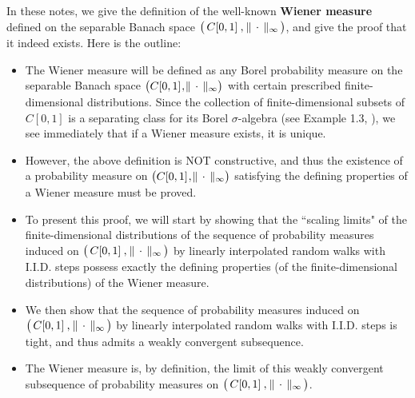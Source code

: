\documentclass[10pt, letterpaper]{article}
\newcommand{\Czo}{C[0,1]}
\begin{document}


\pagestyle{fancy}

\chead[]{{\Large\bf The Wiener Measure on $\left(\,\Czo\,\overset{{\color{white}1}}{,}\,\Vert\,\cdot\,\Vert_{\infty}\,\right)$} \\
\vskip 0.1cm \normalsize \today}
\lfoot[]{}
\cfoot[]{}
\rfoot[]{\thepage}



\mbox{}\vskip 0.0cm
\noindent
In these notes, we give the definition of the well-known \textbf{Wiener measure} defined
on the separable Banach space
$\left(\,\Czo\,\overset{{\color{white}1}}{,}\,\Vert\,\cdot\,\Vert_{\infty}\,\right)$,
and give the proof that it indeed exists.
Here is the outline:
\begin{itemize}
\item
	The Wiener measure will be defined as any Borel probability measure on
	the separable Banach space
	$\left(\Czo\overset{{\color{white}1}}{,}\Vert\,\cdot\,\Vert_{\infty}\right)$
	with certain prescribed finite-dimensional distributions.
	Since the collection of finite-dimensional subsets of $\Czo$ is a separating class
	for its Borel $\sigma$-algebra (see Example 1.3, \cite{Billingsley1999}),
	we see immediately that if a Wiener measure exists, it is unique.
\item
	However, the above definition is NOT constructive, and thus the existence of a probability
	measure on
	$\left(\Czo\overset{{\color{white}1}}{,}\Vert\,\cdot\,\Vert_{\infty}\right)$
	satisfying the defining properties of a Wiener measure must be proved.
\item
	To present this proof, we will start by showing that
	the ``scaling limits" of the finite-dimensional distributions of
	the sequence of probability measures induced on
	$\left(\,\Czo\,\overset{{\color{white}1}}{,}\,\Vert\,\cdot\,\Vert_{\infty}\,\right)$
	by linearly interpolated random walks with I.I.D. steps possess exactly the
	defining properties (of the finite-dimensional distributions) of the Wiener measure.
\item
	We then show that
	the sequence of probability measures induced on
	$\left(\,\Czo\,\overset{{\color{white}1}}{,}\,\Vert\,\cdot\,\Vert_{\infty}\,\right)$
	by linearly interpolated random walks with I.I.D. steps is tight, and thus
	admits a weakly convergent subsequence.
\item
	The Wiener measure is, by definition, the limit of this
	weakly convergent subsequence of probability measures on
	$\left(\,\Czo\,\overset{{\color{white}1}}{,}\,\Vert\,\cdot\,\Vert_{\infty}\,\right)$.
\end{itemize} 
\end{document}
